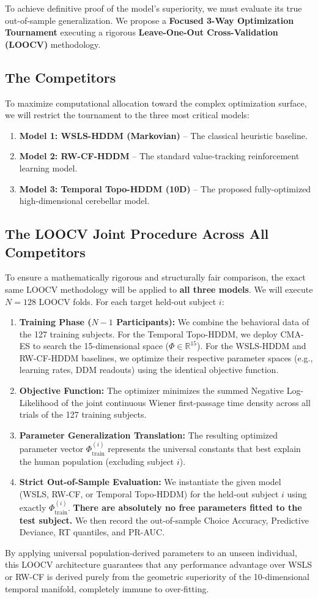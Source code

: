 \documentclass[11pt,a4paper]{article}
\begin{document}
To achieve definitive proof of the model's superiority, we must evaluate its true out-of-sample generalization. We propose a \textbf{Focused 3-Way Optimization Tournament} executing a rigorous \textbf{Leave-One-Out Cross-Validation (LOOCV)} methodology.

\subsection{The Competitors}
To maximize computational allocation toward the complex optimization surface, we will restrict the tournament to the three most critical models:
\begin{enumerate}
    \item \textbf{Model 1: WSLS-HDDM (Markovian)} -- The classical heuristic baseline.
    \item \textbf{Model 2: RW-CF-HDDM} -- The standard value-tracking reinforcement learning model.
    \item \textbf{Model 3: Temporal Topo-HDDM (10D)} -- The proposed fully-optimized high-dimensional cerebellar model.
\end{enumerate}

\subsection{The LOOCV Joint Procedure Across All Competitors}
To ensure a mathematically rigorous and structurally fair comparison, the exact same LOOCV methodology will be applied to \textbf{all three models}. We will execute $N=128$ LOOCV folds. For each target held-out subject $i$:
\begin{enumerate}
    \item \textbf{Training Phase ($N-1$ Participants):} We combine the behavioral data of the 127 training subjects. For the Temporal Topo-HDDM, we deploy CMA-ES to search the 15-dimensional space ($\Phi \in \mathbb{R}^{15}$). For the WSLS-HDDM and RW-CF-HDDM baselines, we optimize their respective parameter spaces (e.g., learning rates, DDM readouts) using the identical objective function.
    \item \textbf{Objective Function:} The optimizer minimizes the summed Negative Log-Likelihood of the joint continuous Wiener first-passage time density across all trials of the 127 training subjects.
    \item \textbf{Parameter Generalization Translation:} The resulting optimized parameter vector $\Phi_{\text{train}}^{(i)}$ represents the universal constants that best explain the human population (excluding subject $i$).
    \item \textbf{Strict Out-of-Sample Evaluation:} We instantiate the given model (WSLS, RW-CF, or Temporal Topo-HDDM) for the held-out subject $i$ using exactly $\Phi_{\text{train}}^{(i)}$. \textbf{There are absolutely no free parameters fitted to the test subject.} We then record the out-of-sample Choice Accuracy, Predictive Deviance, RT quantiles, and PR-AUC.
\end{enumerate}

By applying universal population-derived parameters to an unseen individual, this LOOCV architecture guarantees that any performance advantage over WSLS or RW-CF is derived purely from the geometric superiority of the 10-dimensional temporal manifold, completely immune to over-fitting.
\end{document}
